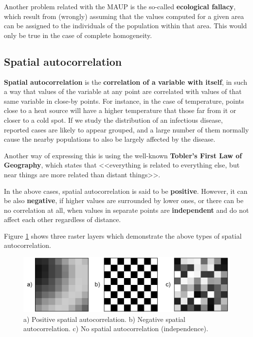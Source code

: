 Another problem related with the MAUP is the so-called \textbf{ecological fallacy}, which result from (wrongly) assuming that the values computed for a given area can be assigned to the individuals of the population within that area. This would only be true in the case of complete homogeneity.


\subsection{Spatial autocorrelation} 

\textbf{Spatial autocorrelation} is the \textbf{correlation of a variable with itself}, in such a way that values of the variable at any point are correlated with values of that same variable in close-by points. For instance, in the case of temperature, points close to a heat source will have a higher temperature that those far from it or closer to a cold spot. If we study the distribution of an infectious disease, reported cases are likely to appear grouped, and a large number of them normally cause the nearby populations to also be largely affected by the disease.

Another way of expressing this is using the well-known \textbf{Tobler's First Law of Geography}, which states that <<everything is related to everything else, but near things are more related than distant things>>.

In the above cases, spatial autocorrelation is said to be \textbf{positive}. However, it can be also \textbf{negative}, if higher values are surrounded by lower ones, or there can be no correlation at all, when values in separate points are \textbf{independent} and do not affect each other regardless of distance.

Figure \ref{Fig:Autocorrelation} shows three raster layers which demonstrate the above types of spatial autocorrelation.

\begin{figure}[!hbt]   
\centering
\includegraphics[width=\textwidth]{Analysis/Autocorrelation.png}
\caption{\small a) Positive spatial autocorrelation. b) Negative spatial autocorrelation. c) No spatial autocorrelation (independence).}
\label{Fig:Autocorrelation} 
\end{figure}

